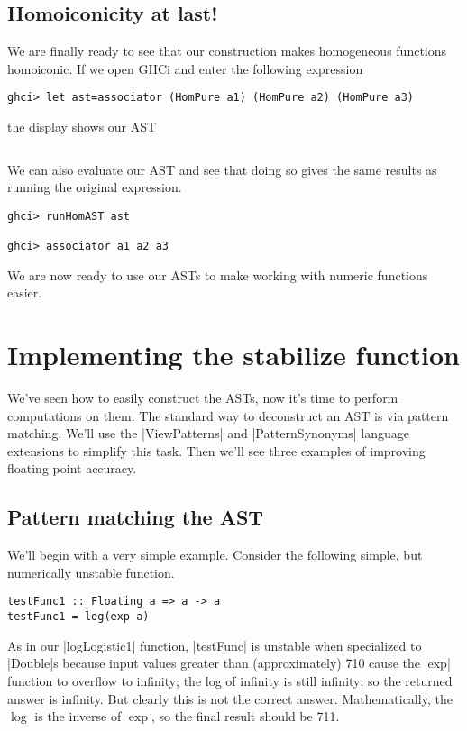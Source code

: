 \documentclass[preprint]{sigplanconf}
\theoremstyle{definition}
\begin{document}
\subsection{Homoiconicity at last!}
We are finally ready to see that our construction makes homogeneous functions homoiconic.
If we open GHCi and enter the following expression
\begin{lstlisting}
ghci> let ast=associator (HomPure a1) (HomPure a2) (HomPure a3)
\end{lstlisting}
the display shows our AST
\begin{lstlisting}
\end{lstlisting}
We can also evaluate our AST and see that doing so gives the same results as running the original expression.
\begin{lstlisting}
ghci> runHomAST ast

ghci> associator a1 a2 a3

\end{lstlisting}
We are now ready to use our ASTs to make working with numeric functions easier.

\section{Implementing the stabilize function}

We've seen how to easily construct the ASTs,
now it's time to perform computations on them.
The standard way to deconstruct an AST is via pattern matching.
We'll use the |ViewPatterns| and |PatternSynonyms| language extensions to simplify this task.
Then we'll see three examples of improving floating point accuracy.

\subsection{Pattern matching the AST}

We'll begin with a very simple example.
Consider the following simple, but numerically unstable function.
\begin{lstlisting}
testFunc1 :: Floating a => a -> a
testFunc1 = log(exp a)
\end{lstlisting}
As in our |logLogistic1| function, |testFunc| is unstable when specialized to |Double|s
because input values greater than (approximately) 710 cause the |exp| function to overflow to infinity;
the log of infinity is still infinity;
so the returned answer is infinity.
But clearly this is not the correct answer.
Mathematically, the $\log$ is the inverse of $\exp$, so the final result should be 711.
\end{document}
